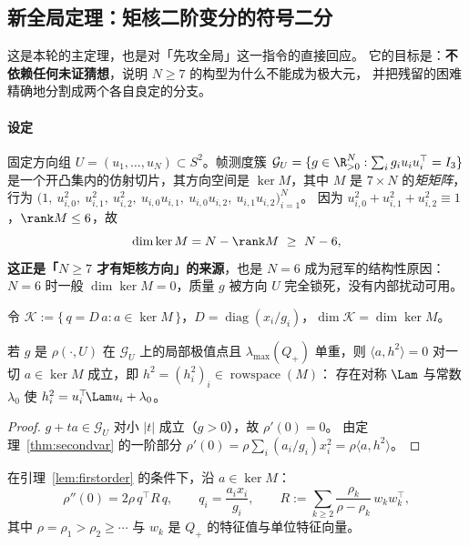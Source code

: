 \subsection{新全局定理：矩核二阶变分的符号二分}\label{sec:r17:dichotomy}

这是本轮的主定理，也是对「先攻全局」这一指令的直接回应。
它的目标是：\textbf{不依赖任何未证猜想}，说明 $N\ge7$ 的构型为什么不能成为极大元，
并把残留的困难精确地分割成两个各自良定的分支。

\paragraph{设定}
固定方向组 $U=(u_1,\dots,u_N)\subset S^2$。帧测度簇
$\mathcal G_U=\{g\in\R^N_{>0}:\sum_ig_iu_iu_i^\top=I_3\}$
是一个开凸集内的仿射切片，其方向空间是
$\ker M$，其中 $M$ 是 $7\times N$ 的\emph{矩矩阵}，
行为 $\bigl(1,\ u_{i,0}^2,\ u_{i,1}^2,\ u_{i,2}^2,\ u_{i,0}u_{i,1},\ u_{i,0}u_{i,2},\ u_{i,1}u_{i,2}\bigr)_{i=1}^N$。
因为 $u_{i,0}^2+u_{i,1}^2+u_{i,2}^2\equiv1$，$\rank M\le6$，故
\begin{equation}\label{eq:kerdim}
\dim\ker M=N-\rank M\ \ge\ N-6 ,
\end{equation}
\textbf{这正是「$N\ge7$ 才有矩核方向」的来源}，也是 $N=6$ 成为冠军的结构性原因：
$N=6$ 时一般 $\dim\ker M=0$，质量 $g$ 被方向 $U$ 完全锁死，没有内部扰动可用。

令 $\mathcal K:=\{\,q=D\,a:a\in\ker M\,\}$，$D=\operatorname{diag}(x_i/g_i)$，$\dim\mathcal K=\dim\ker M$。

\begin{lemma}[一阶条件是无条件的]\label{lem:firstorder}
若 $g$ 是 $\rho(\cdot,U)$ 在 $\mathcal G_U$ 上的局部极值点且 $\lambda_{\max}(Q_+)$ 单重，则
$\langle a,h^2\rangle=0$ 对一切 $a\in\ker M$ 成立，即 $h^2=(h_i^2)_i\in\operatorname{rowspace}(M)$：
存在对称 $\Lam$ 与常数 $\lambda_0$ 使 $h_i^2=u_i^\top\!\Lam u_i+\lambda_0$。
\end{lemma}

\begin{proof}
$g+ta\in\mathcal G_U$ 对小 $|t|$ 成立（$g>0$），故 $\rho'(0)=0$。
由定理~\ref{thm:secondvar} 的一阶部分 $\rho'(0)=\rho\sum_i(a_i/g_i)x_i^2=\rho\langle a,h^2\rangle$。
\end{proof}

\begin{theorem}[二阶变分的谱形式，复核]\label{thm:secondvar2}
在引理~\ref{lem:firstorder} 的条件下，沿 $a\in\ker M$：
\begin{equation}\label{eq:secondvar2}
\rho''(0)=2\rho\,q^\top R\,q,\qquad q_i=\frac{a_ix_i}{g_i},\qquad
R:=\sum_{k\ge2}\frac{\rho_k}{\rho-\rho_k}\,w_kw_k^\top ,
\end{equation}
其中 $\rho=\rho_1>\rho_2\ge\cdots$ 与 $w_k$ 是 $Q_+$ 的特征值与单位特征向量。
\end{theorem}

